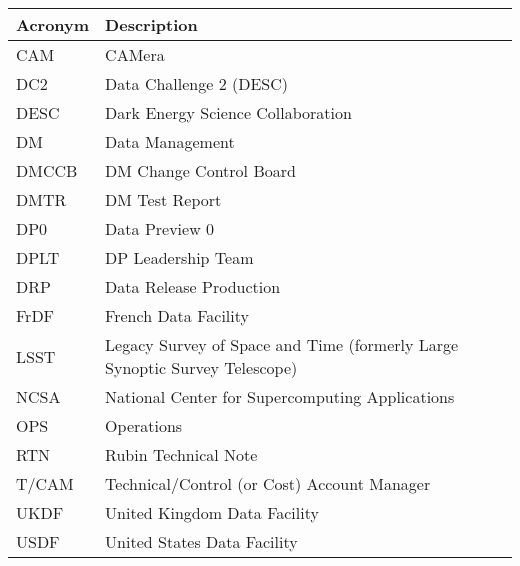 \addtocounter{table}{-1}
\begin{longtable}{p{}p{}}\hline
\textbf{Acronym} & \textbf{Description}  \\\hline

CAM & CAMera \\\hline
DC2 & Data Challenge 2 (DESC) \\\hline
DESC & Dark Energy Science Collaboration \\\hline
DM & Data Management \\\hline
DMCCB & DM Change Control Board \\\hline
DMTR & DM Test Report \\\hline
DP0 & Data Preview 0 \\\hline
DPLT & DP Leadership Team \\\hline
DRP & Data Release Production \\\hline
FrDF & French Data Facility \\\hline
LSST & Legacy Survey of Space and Time (formerly Large Synoptic Survey Telescope) \\\hline
NCSA & National Center for Supercomputing Applications \\\hline
OPS & Operations \\\hline
RTN & Rubin Technical Note \\\hline
T/CAM & Technical/Control (or Cost) Account Manager \\\hline
UKDF & United Kingdom Data Facility \\\hline
USDF & United States Data Facility \\\hline
\end{longtable}
